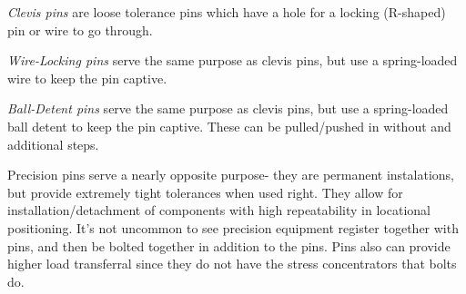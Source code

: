 \documentclass[10pt,letterpaper]{book}
\begin{document}
	\begin{asparaenum}[a)]
		\item \textit{Clevis pins} are loose tolerance pins which have a hole for a locking (R-shaped) pin or wire to go through.
		\item \textit{Wire-Locking pins} serve the same purpose as clevis pins, but use a spring-loaded wire to keep the pin captive.
		\item \textit{Ball-Detent pins} serve the same purpose as clevis pins, but use a spring-loaded ball detent to keep the pin captive. These can be pulled/pushed in without and additional steps.
	\end{asparaenum}
	
	
	Precision pins serve a nearly opposite purpose- they are permanent instalations, but provide extremely tight tolerances when used right. They allow for installation/detachment of components with high repeatability in locational positioning. It's not uncommon to see precision equipment register together with pins, and then be bolted together in addition to the pins. Pins also can provide higher load transferral since they do not have the stress concentrators that bolts do.
	
\end{document}
